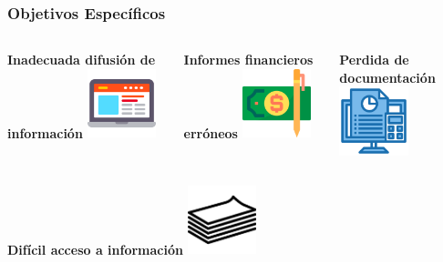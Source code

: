 \documentclass[xcolor=dvipsnames]{beamer}
\begin{document}
\begin{frame}
    \frametitle{Objetivos Específicos}
    \vspace{5mm}
    \begin{columns}
      \begin{column}{0.3\textwidth}
        \centering\textbf{\textcolor{color3}{\small Inadecuada difusión de información}\vspace{3mm}}
        \vspace{10mm}
        \includegraphics[width=20mm]{033-laptop}
      \end{column}
      \begin{column}{0.3\textwidth}
        \centering\textbf{\textcolor{color3}{\small Informes financieros erróneos}\vspace{3mm}}
        \vspace{10mm}
        \includegraphics[width=20mm]{020-money-2}
      \end{column}
      \begin{column}{0.3\textwidth}
        \centering\textbf{\textcolor{color3}{\small Perdida de documentación}\vspace{3mm}}
        \vspace{10mm}
        \includegraphics[width=20mm]{036-system}
      \end{column}
    \end{columns}
    \vspace{-2mm}
    \begin{columns}
      \begin{column}{0.3\textwidth}
        \centering\textbf{\textcolor{color3}{\small Difícil acceso a información}\vspace{3mm}}
        \vspace{10mm}
        \includegraphics[width=20mm]{028-paper}

\end{column}
\end{columns}
\end{frame}
\end{document}
